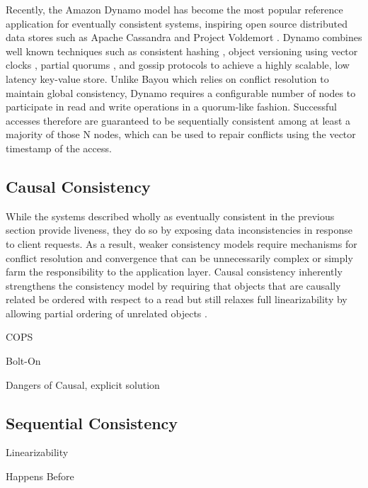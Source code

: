 \documentclass[letterpaper,twocolumn,10pt]{article}
\begin{document}
Recently, the Amazon Dynamo \cite{decandia_dynamo_2007} model has become the most popular reference application for eventually consistent systems, inspiring open source distributed data stores such as Apache Cassandra \cite{lakshman_cassandra_2010} and Project Voldemort \cite{feinberg2011project}. Dynamo combines well known techniques such as consistent hashing \cite{stoica_chord_2001}, object versioning using vector clocks \cite{lamport_time_1978}, partial quorums \cite{aiyer_availability_2005}, and gossip protocols to achieve a highly scalable, low latency key-value store. Unlike Bayou which relies on conflict resolution to maintain global consistency, Dynamo requires a configurable number of nodes to participate in read and write operations in a quorum-like fashion. Successful accesses therefore are guaranteed to be sequentially consistent among at least a majority of those N nodes, which can be used to repair conflicts using the vector timestamp of the access.

\subsection{Causal Consistency}

While the systems described wholly as eventually consistent in the previous section provide liveness, they do so by exposing data inconsistencies in response to client requests. As a result, weaker consistency models require mechanisms for conflict resolution and convergence that can be unnecessarily complex or simply farm the responsibility to the application layer. Causal consistency inherently strengthens the consistency model by requiring that objects that are causally related be ordered with respect to a read but still relaxes full linearizability by allowing partial ordering of unrelated objects    \cite{ahamad_causal_1990}.


COPS \cite{lloyd_dont_2011}

Bolt-On \cite{bailis_bolt-causal_2013}

Dangers of Causal, explicit solution \cite{bailis_potential_2012}

\subsection{Sequential Consistency}

Linearizability \cite{herlihy_linearizability_1990}

Happens Before \cite{lamport_time_1978}
\end{document}
